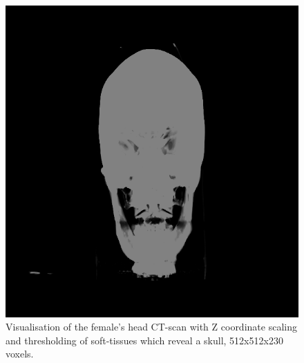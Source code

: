 \documentclass[twoside, english, 11pt]{report}
\begin{document}
\begin{figure}[H]
\centerline{\includegraphics[scale = 0.45]{img/head-th}}
\caption{Visualisation of the female's head CT-scan with Z coordinate scaling and thresholding of soft-tissues which reveal a skull, 512x512x230 voxels.\label{fig:head-th}}
\end{figure}
\end{document}
